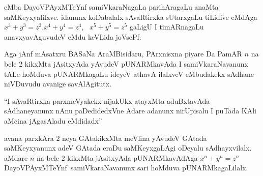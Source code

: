 eMba DayoVPAyxMTeYnf samiVkaraNagaLa parihAragaLu anaMta saMKeyxyalilxve. idanunx koDabalalx sAvaRtirxka sUtarxgaLu tiLidive eMdAga $x^3+y^3=z^3$,\break $x^4+y^4=z^4$,~ $x^5+y^5=z^5$ gaLigU I timARnagaLu anavxyavAguvudeV eMdu keVLida joVsePf.

Aga jAnf mAsatxru BASaNa AraMBisidaru, PArxnisxna piyare Da PamAR $n$ na bele {\rm 2} kikxMta jAsitxyAda yAvudeV pUNARMkavAda I samiVkaraNavanunx tALe hoMduva pUNARMkagaLu ideyeV athavA ilalxveV eMbudakekx sAdhane niVDuvudu avanige savAlAgitutx.

``I sAvaRtirxka parxmeVyakekx nijakUkx atayxMta aduBxtavAda sAdhaneyanunx nAnu paDedidedxVne Adare adanunx nirUpisalu I puTada KAli aMcina jAgasAladu eMdidadx''

avana parxkAra $2$ neya GAtakikxMta meVlina yAvudeV GAtada saMKeyxyanunx adeV GAtada eraDu saMKeyxgaLAgi oDeyalu sAdhayxvilalx. aMdare $n$ na bele {\rm 2} kikxMta jAsitx\-yAda pUNARMkavAdAga $x^n+y^n=z^n$ DayoVPAyxMTeYnf~samiVkaraNavanunx sari hoMduva pUNARMkagaLilalx.


